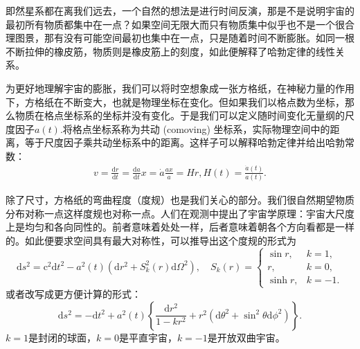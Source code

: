 \documentclass[../天体物理基础.tex]{subfiles}
\begin{document}
即然星系都在离我们远去，一个自然的想法是进行时间反演，那是不是说明宇宙的最初所有物质都集中在一点？如果空间无限大而只有物质集中似乎也不是一个很合理图景，那有没有可能空间最初也集中在一点，只是随着时间不断膨胀。如同一根不断拉伸的橡皮筋，物质则是橡皮筋上的刻度，如此便解释了哈勃定律的线性关系。

为更好地理解宇宙的膨胀，我们可以将时空想象成一张方格纸，在神秘力量的作用下，方格纸在不断变大，也就是物理坐标在变化。但如果我们以格点数为坐标，那么物质在格点坐标系的坐标并没有变化。于是我们可以定义随时间变化无量纲的尺度因子$a\left(t\right)$.将格点坐标系称为共动 (comoving) 坐标系，实际物理空间中的距离，等于尺度因子乘共动坐标系中的距离。这样子可以解释哈勃定律并给出哈勃常数：
\begin{align}
v=\frac{\mathrm{d}r}{\mathrm{d}t}=\frac{\mathrm{d}a}{\mathrm{d}t}x=\dot{a}\frac{ax}{a}=Hr,H\left(t\right)=\frac{\dot a\left(t\right)}{a\left(t\right)}.
\end{align}

除了尺寸，方格纸的弯曲程度（度规）也是我们关心的部分。我们很自然期望物质分布对称一点这样度规也对称一点。人们在观测中提出了宇宙学原理：宇宙大尺度上是均匀和各向同性的。前者意味着处处一样，后者意味着朝各个方向看都是一样的。如此便要求空间具有最大对称性，可以推导出这个度规的形式为
\begin{equation}
\mathrm{d}s^{2}=\mathrm{c}^{2}\mathrm{d}t^{2}-a^{2}\left(t\right)\left(\mathrm{d}r^{2}+S_{k}^{2}\left(r\right)\mathrm{d}\Omega^{2}\right),\quad S_{k}\left(r\right)=
\begin{cases}
\sin r,&k=1,\\
r,&k=0,\\
\sinh r,&k=-1.
\end{cases}
\end{equation}
或者改写成更方便计算的形式：
\begin{equation}
\mathrm{d}s^{2}=-\mathrm{d}t^{2}+a^{2}\left(t\right)\left\{\frac{\mathrm{d}r^{2}}{1-kr^{2}}+r^{2}\left(\mathrm{d}\theta^{2}+\sin^{2}\theta\mathrm{d}\phi^{2}\right)\right\}.\label{1.6.4}
\end{equation}
$k=1$是封闭的球面，$k=0$是平直宇宙，$k=-1$是开放双曲宇宙。
\end{document}
